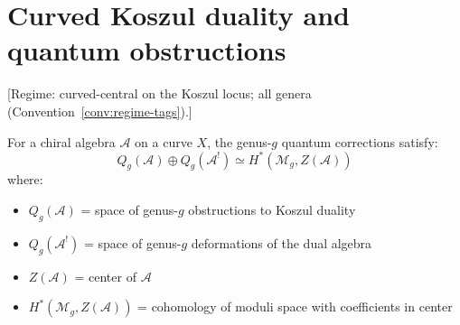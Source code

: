 \section{Curved Koszul duality and quantum obstructions}
\label{sec:curved-koszul-quantum}

\begin{theorem}\label{thm:deformation-obstruction}
\textup{[Regime: curved-central on the Koszul locus; all genera
\textup{(}Convention~\textup{\ref{conv:regime-tags})}.]}

For a chiral algebra $\mathcal{A}$ on a curve $X$, the genus-$g$ quantum corrections
satisfy:
\[Q_g(\mathcal{A}) \oplus Q_g(\mathcal{A}^!) \simeq H^*(\mathcal{M}_g, Z(\mathcal{A}))\]
where:
\begin{itemize}
\item $Q_g(\mathcal{A})$ = space of genus-$g$ obstructions to Koszul duality
\item $Q_g(\mathcal{A}^!)$ = space of genus-$g$ deformations of the dual algebra
\item $Z(\mathcal{A})$ = center of $\mathcal{A}$
\item $H^*(\mathcal{M}_g, Z(\mathcal{A}))$ = cohomology of moduli space with coefficients in center
\end{itemize}
\end{theorem}

